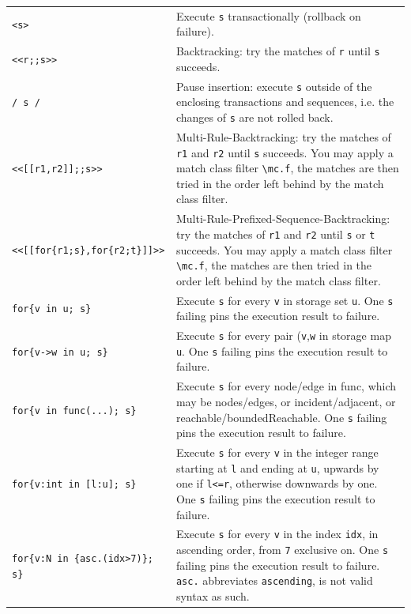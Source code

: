 \begin{table}[htbp]
\begin{minipage}{\linewidth} \renewcommand{\footnoterule}{} 
\begin{tabularx}{\linewidth}{|lX|}
\hline
\texttt{<s>} & Execute \texttt{s} transactionally (rollback on failure).\\
\texttt{<<r;;s>>} & Backtracking: try the matches of \texttt{r} until \texttt{s} succeeds.\\
\texttt{/ s /} & Pause insertion: execute \texttt{s} outside of the enclosing transactions and sequences, i.e. the changes of \texttt{s} are not rolled back.\\
\hline
\texttt{<<[[r1,r2]];;s>>} & Multi-Rule-Backtracking: try the matches of \texttt{r1} and \texttt{r2} until \texttt{s} succeeds. You may apply a match class filter \texttt{\textbackslash mc.f}, the matches are then tried in the order left behind by the match class filter.\\
\texttt{<<[[for\{r1;s\},for\{r2;t\}]]>>} & Multi-Rule-Prefixed-Sequence-Backtracking: try the matches of \texttt{r1} and \texttt{r2} until \texttt{s} or \texttt{t} succeeds. You may apply a match class filter \texttt{\textbackslash mc.f}, the matches are then tried in the order left behind by the match class filter.\\
\hline
\texttt{for\{v in u; s\}} & Execute \texttt{s} for every \texttt{v} in storage set \texttt{u}. One \texttt{s} failing pins the execution result to failure.\\
\texttt{for\{v->w in u; s\}} & Execute \texttt{s} for every pair (\texttt{v},\texttt{w} in storage map \texttt{u}. One \texttt{s} failing pins the execution result to failure.\\
\texttt{for\{v in func(...); s\}} & Execute \texttt{s} for every node/edge in func, which may be nodes/edges, or incident/adjacent, or reachable/boundedReachable. One \texttt{s} failing pins the execution result to failure.\\
\texttt{for\{v:int in [l:u]; s\}} & Execute \texttt{s} for every \texttt{v} in the integer range starting at \texttt{l} and ending at \texttt{u}, upwards by one if \texttt{l<=r}, otherwise downwards by one. One \texttt{s} failing pins the execution result to failure.\\
\texttt{for\{v:N in \{asc.(idx>7)\}; s\}} & Execute \texttt{s} for every \texttt{v} in the index \texttt{idx}, in ascending order, from \texttt{7} exclusive on. One \texttt{s} failing pins the execution result to failure. \texttt{asc.} abbreviates \texttt{ascending}, is not valid syntax as such.\\

\end{tabularx}
\end{minipage}
\end{table}
